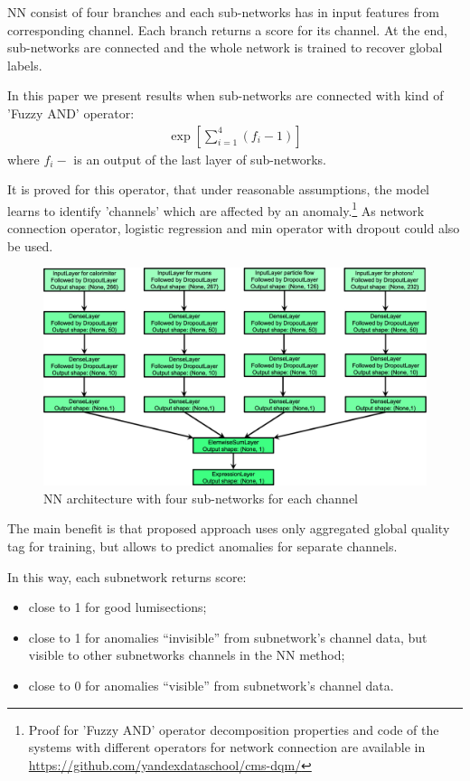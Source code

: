 \documentclass[a4paper]{jpconf}
\begin{document}
NN consist of four branches and each sub-networks has in input features from 
corresponding channel. Each branch returns a score for its channel. At the end, sub-networks are
connected and the whole network is trained to recover global labels.

In this paper we present results when sub-networks are connected with kind of 'Fuzzy AND' operator: \begin{eqnarray}
\exp\left[\sum_{i=1}^4(f_{i} - 1)\right]
\end{eqnarray}
where $f_{i} - $ is an output of the last layer of sub-networks. 

It is proved for this operator, that under reasonable assumptions, the model learns to identify 'channels' which are affected by an anomaly.\footnote{Proof for 'Fuzzy AND' operator decomposition properties and code of the systems with different operators for network connection are available in \url{https://github.com/yandexdataschool/cms-dqm/} } As network connection operator, logistic regression and min operator with dropout could also be used. 

\begin{figure}[h!]
\begin{center}
\includegraphics[width=4.5in]{figures/net.png}
\end{center}
\caption{\label{fig:nn}NN architecture with four sub-networks for each channel}
\end{figure}


The main benefit is that proposed approach uses only aggregated global quality tag for training, but allows to predict anomalies for separate channels.

In this way, each subnetwork returns score:
\begin{itemize}
\item close to 1 for good lumisections;
\item close to 1 for anomalies “invisible” from subnetwork’s channel data, but visible to other subnetworks channels in the NN method;
\item close to 0 for anomalies “visible” from subnetwork’s channel data.
\end{itemize}
\end{document}
